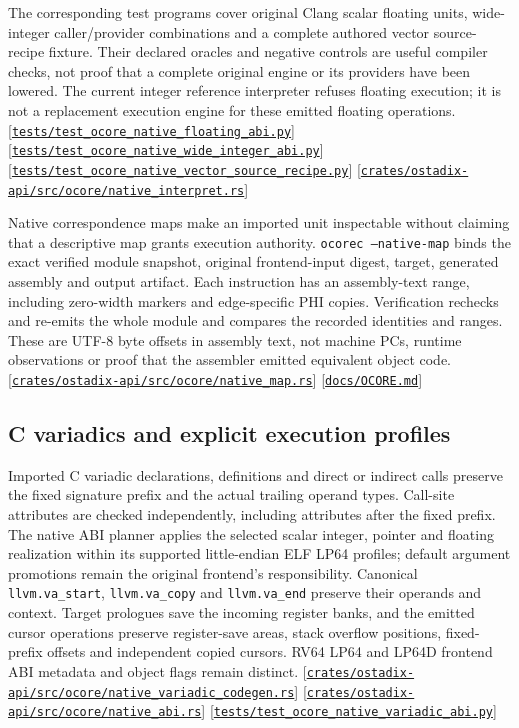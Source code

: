 \documentclass[11pt,oneside]{article}
\newcommand{\src}[1]{\textcolor{OSlate}{\scriptsize[\href{https://github.com/lostadi/OSTADIX/blob/c0b02c326b2329a95ba52447c7180bc93957cd57/#1}{\nolinkurl{#1}}]}\allowbreak}
\begin{document}
The corresponding test programs cover original Clang scalar floating units,
wide-integer caller/provider combinations and a complete authored vector
source-recipe fixture. Their declared oracles and negative controls are useful
compiler checks, not proof that a complete original engine or its providers
have been lowered. The current integer reference interpreter refuses floating
execution; it is not a replacement execution engine for these emitted
floating operations.
\src{tests/test_ocore_native_floating_abi.py}
\src{tests/test_ocore_native_wide_integer_abi.py}
\src{tests/test_ocore_native_vector_source_recipe.py}
\src{crates/ostadix-api/src/ocore/native_interpret.rs}

Native correspondence maps make an imported unit inspectable without
claiming that a descriptive map grants execution authority.
\texttt{ocorec --native-map} binds the exact verified module snapshot,
original frontend-input digest, target, generated assembly and output
artifact. Each instruction has an assembly-text range, including zero-width
markers and edge-specific PHI copies. Verification rechecks and re-emits the
whole module and compares the recorded identities and ranges. These are
UTF-8 byte offsets in assembly text, not machine PCs, runtime observations
or proof that the assembler emitted equivalent object code.
\src{crates/ostadix-api/src/ocore/native_map.rs}
\src{docs/OCORE.md}

\subsection{C variadics and explicit execution profiles}

Imported C variadic declarations, definitions and direct or indirect calls
preserve the fixed signature prefix and the actual trailing operand types.
Call-site attributes are checked independently, including attributes after
the fixed prefix. The native ABI planner applies the selected scalar integer, pointer and
floating realization within its supported little-endian ELF LP64 profiles;
default argument promotions remain the original frontend's responsibility. Canonical
\texttt{llvm.va\_start}, \texttt{llvm.va\_copy} and \texttt{llvm.va\_end}
preserve their operands and context. Target prologues save the incoming
register banks, and the emitted cursor operations preserve register-save
areas, stack overflow positions, fixed-prefix offsets and independent copied
cursors. RV64 LP64 and LP64D frontend ABI metadata and object flags remain
distinct.
\src{crates/ostadix-api/src/ocore/native_variadic_codegen.rs}
\src{crates/ostadix-api/src/ocore/native_abi.rs}
\src{tests/test_ocore_native_variadic_abi.py}
\end{document}
